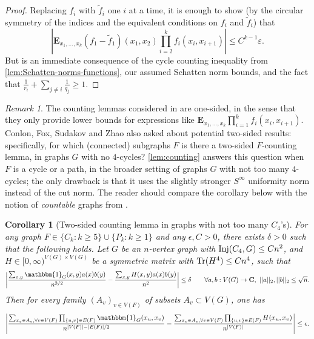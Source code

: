 \documentclass[reqno,11pt]{amsart}
\newtheorem{corollary}[theorem]{Corollary}
\theoremstyle{definition}
\theoremstyle{remark}
\newtheorem*{remark}{Remark}
\numberwithin{equation}{section}
\newcommand{\C}{\mathbf{C}}
\newcommand{\E}{\mathbf{E}}
\newcommand{\one}{\mathbbm{1}}
\newcommand{\eps}{\varepsilon}
\renewcommand{\tilde}{\widetilde}
\newcommand{\Tr}{\textnormal{Tr}}
\newcommand{\Inj}{\textnormal{Inj}}
\begin{document}
\begin{proof}
Replacing $f_{i}$ with $\tilde{f}_{i}$ one $i$ at a time, it is enough to show (by the circular symmetry of the indices and the equivalent conditions on $f_{i}$ and $\tilde{f}_{i}$) that
\[
    \left\vert \E_{x_1, \ldots, x_k} (f_{1} - \tilde{f}_{1})(x_1,x_2) \prod_{i=2}^k f_{i}(x_i,x_{i+1}) \right\vert \le C^{k-1} \eps.
\]
But is an immediate consequence of the cycle counting inequality from \cref{lem:Schatten-norms-functions}, our assumed Schatten norm bounds, and the fact that $\frac{1}{r_i} + \sum_{j \neq i} \frac{1}{q_j} \ge 1$.
\end{proof}

\begin{remark}
The counting lemmas considered in \cite{conlon2021regularity,conlon2021graphs} are one-sided, in the sense that they only provide lower bounds for expressions like $\E_{x_1, \ldots, x_k} \prod_{i=1}^k f_{i}(x_i,x_{i+1})$. Conlon, Fox, Sudakov and Zhao also asked \cite{conlon2021graphs} about potential two-sided results: specifically, for which (connected) subgraphs $F$ is there a two-sided $F$-counting lemma, in graphs $G$ with no $4$-cycles? \cref{lem:counting} answers this question when $F$ is a cycle or a path, in the broader setting of graphs $G$ with not too many $4$-cycles; the only drawback is that it uses the slightly stronger $S^\infty$ uniformity norm instead of the cut norm. The reader should compare the corollary below with the notion of \emph{countable} graphs from \cite{conlon2021graphs}.
\end{remark}

\begin{corollary}[Two-sided counting lemma in graphs with not too many $C_4$'s] \label{cor:two-sided-counting}
For any graph $F \in \{C_k : k \ge 5\} \cup \{P_k : k \ge 1\}$ and any $\epsilon, C > 0$, there exists $\delta > 0$ such that the following holds. Let $G$ be an $n$-vertex graph with $\Inj(C_4, G) \le Cn^2$, and $H \in [0, \infty)^{V(G) \times V(G)}$ be a symmetric matrix with $\Tr(H^4) \le Cn^4$, such that
\[
    \left\vert \frac{\sum_{x,y} \one_{G}(x,y) a(x)b(y)}{n^{3/2}} - \frac{\sum_{x,y} H(x,y)a(x)b(y)}{n^2} \right\vert \le \delta
    \qquad
    \forall a, b : V(G) \to \C,\  ||a||_{2}, ||b||_{2} \le \sqrt{n}.
\]
Then for every family $(A_v)_{v \in V(F)}$ of subsets $A_v \subset V(G)$, one has
\[
    \left\vert 
    \frac{\sum_{x_v \in A_v, \forall v \in V(F)} \prod_{\{u, v\} \in E(F)} \one_{G}(x_u,x_v)}{n^{|V(F)| - |E(F)|/2}}
    -
    \frac{\sum_{x_v \in A_v, \forall v \in V(F)} \prod_{\{u, v\} \in E(F)} H(x_u,x_v)}{n^{|V(F)|}}
    \right\vert
    \le \epsilon.
\]
\end{corollary}
\end{document}

